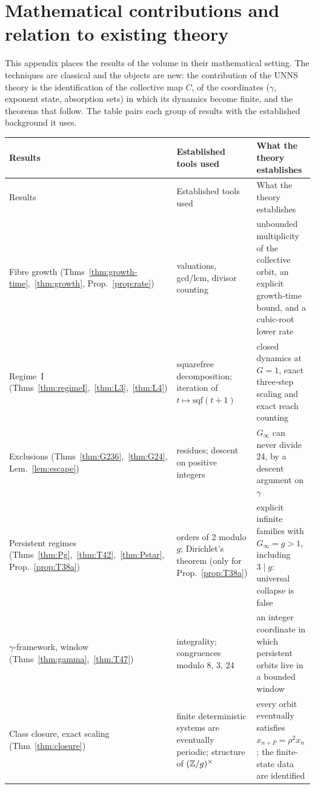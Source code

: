 \chapter{Mathematical contributions and relation to existing theory}\label{app:contrib}

This appendix places the results of the volume in their mathematical setting. The techniques are classical and the objects are new: the contribution of the UNNS theory is the identification of the collective map \(C\), of the coordinates (\(\gamma\), exponent state, absorption sets) in which its dynamics become finite, and the theorems that follow. The table pairs each group of results with the established background it uses.

\footnotesize
\begin{longtable}{@{}p{34mm}p{36mm}p{52mm}@{}}
\toprule Results & Established tools used & What the theory establishes\\\midrule\endfirsthead
\toprule Results & Established tools used & What the theory establishes\\\midrule\endhead
Fibre growth (Thms~\ref{thm:growth-time},~\ref{thm:growth}, Prop.~\ref{prop:rate}) & valuations, gcd/lcm, divisor counting & unbounded multiplicity of the collective orbit, an explicit growth-time bound, and a cubic-root lower rate\\
Regime~I (Thms~\ref{thm:regimeI},~\ref{thm:L3},~\ref{thm:L4}) & squarefree decomposition; iteration of \(t\mapsto\mathrm{sqf}(t+1)\) & closed dynamics at \(G=1\), exact three-step scaling and exact reach counting\\
Exclusions (Thms~\ref{thm:G236},~\ref{thm:G24}, Lem.~\ref{lem:escape}) & residues; descent on positive integers & \(G_\infty\) can never divide 24, by a descent argument on \(\gamma\)\\
Persistent regimes (Thms~\ref{thm:Pg},~\ref{thm:T42},~\ref{thm:Pstar}, Prop.~\ref{prop:T38a}) & orders of 2 modulo \(g\); Dirichlet's theorem (only for Prop.~\ref{prop:T38a}) & explicit infinite families with \(G_\infty=g>1\), including \(3\mid g\): universal collapse is false\\
\(\gamma\)-framework, window (Thms~\ref{thm:gamma},~\ref{thm:T47}) & integrality; congruences modulo 8, 3, 24 & an integer coordinate in which persistent orbits live in a bounded window\\
Class closure, exact scaling (Thm~\ref{thm:closure}) & finite deterministic systems are eventually periodic; structure of \((\mathbb{Z}/g)^\times\) & every orbit eventually satisfies \(x_{n+P}=\rho^2x_n\); the finite-state data are identified\\

\end{longtable}
